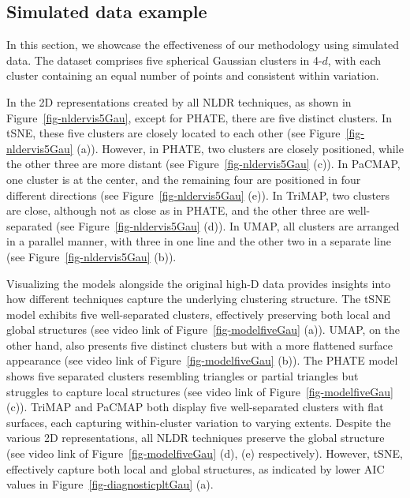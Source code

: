 \documentclass[
  12pt]{article}
\begin{document}
\hypertarget{sec-simpleex}{%
\subsection{Simulated data example}\label{sec-simpleex}}

In this section, we showcase the effectiveness of our methodology using
simulated data. The dataset comprises five spherical Gaussian clusters
in 4-\(d\), with each cluster containing an equal number of points and
consistent within variation.

In the 2D representations created by all NLDR techniques, as shown in
Figure~\ref{fig-nldervis5Gau}, except for PHATE, there are five distinct
clusters. In tSNE, these five clusters are closely located to each other
(see Figure~\ref{fig-nldervis5Gau} (a)). However, in PHATE, two clusters
are closely positioned, while the other three are more distant (see
Figure~\ref{fig-nldervis5Gau} (c)). In PaCMAP, one cluster is at the
center, and the remaining four are positioned in four different
directions (see Figure~\ref{fig-nldervis5Gau} (e)). In TriMAP, two
clusters are close, although not as close as in PHATE, and the other
three are well-separated (see Figure~\ref{fig-nldervis5Gau} (d)). In
UMAP, all clusters are arranged in a parallel manner, with three in one
line and the other two in a separate line (see
Figure~\ref{fig-nldervis5Gau} (b)).

Visualizing the models alongside the original high-D data provides
insights into how different techniques capture the underlying clustering
structure. The tSNE model exhibits five well-separated clusters,
effectively preserving both local and global structures (see video link
of Figure~\ref{fig-modelfiveGau} (a)). UMAP, on the other hand, also
presents five distinct clusters but with a more flattened surface
appearance (see video link of Figure~\ref{fig-modelfiveGau} (b)). The
PHATE model shows five separated clusters resembling triangles or
partial triangles but struggles to capture local structures (see video
link of Figure~\ref{fig-modelfiveGau} (c)). TriMAP and PaCMAP both
display five well-separated clusters with flat surfaces, each capturing
within-cluster variation to varying extents. Despite the various 2D
representations, all NLDR techniques preserve the global structure (see
video link of Figure~\ref{fig-modelfiveGau} (d), (e) respectively).
However, tSNE, effectively capture both local and global structures, as
indicated by lower AIC values in Figure~\ref{fig-diagnosticpltGau} (a).
\end{document}
